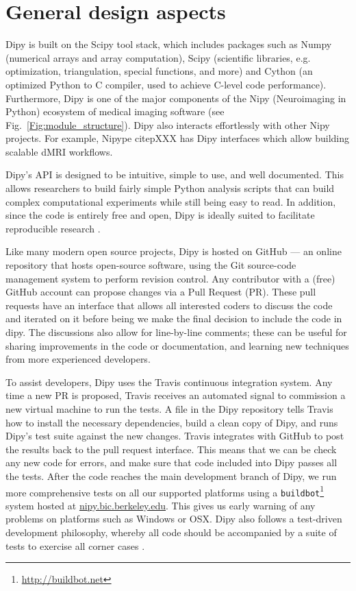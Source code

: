 \documentclass{bioinfo}
\begin{document}
\section{General design aspects}

Dipy is built on the Scipy tool stack, which includes packages such as
Numpy (numerical arrays and array computation), Scipy
(scientific libraries, e.g. optimization, triangulation, special functions,
and more) and Cython (an optimized Python to C compiler, used to achieve
C-level code performance).  Furthermore, Dipy is one of the major components of the Nipy (Neuroimaging in Python) ecosystem of medical imaging software (see
Fig.~\ref{Fig:module_structure}). Dipy also interacts effortlessly with other Nipy projects. For example, Nipype citep{XXX} has Dipy interfaces which allow building scalable dMRI workflows.

Dipy's API is designed to be intuitive, simple to use, and well
documented.  This allows researchers to build fairly simple Python analysis
scripts that can build complex computational experiments while still being easy
to read.  In addition, since the code is entirely free and open, Dipy is ideally suited to facilitate reproducible research \citep{Donoho2010}.

Like many modern open source projects, Dipy is hosted on GitHub --- an online
repository that hosts open-source software, using the Git source-code
management system to perform revision control. Any contributor with a (free)
GitHub account can propose changes via a Pull Request (PR). These pull requests
have an interface that allows all interested coders to discuss the code and
iterated on it before being we make the final decision to include the code in
dipy. The discussions also allow for line-by-line comments; these can be useful
for sharing improvements in the code or documentation, and learning new
techniques from more experienced developers.

To assist developers, Dipy uses the Travis continuous integration system.  Any
time a new PR is proposed, Travis receives an automated signal to commission a
new virtual machine to run the tests.  A file in the Dipy repository tells
Travis how to install the necessary dependencies, build a clean copy of
Dipy, and runs Dipy's test suite against the new changes.  Travis integrates
with GitHub to post the results back to the pull request interface. This means
that we can be check any new code for errors, and make sure that code included
into Dipy passes all the tests. After the code reaches the main development
branch of Dipy, we run more comprehensive tests on all our supported
platforms using a \texttt{buildbot}\footnote{\url{http://buildbot.net}} system hosted at
\url{nipy.bic.berkeley.edu}. This gives us early warning of any problems on
platforms such as Windows or OSX.  Dipy also follows a test-driven development
philosophy, whereby all code should be accompanied by a suite of tests to
exercise all corner cases \citep{Maximilien2003}.
\end{document}
